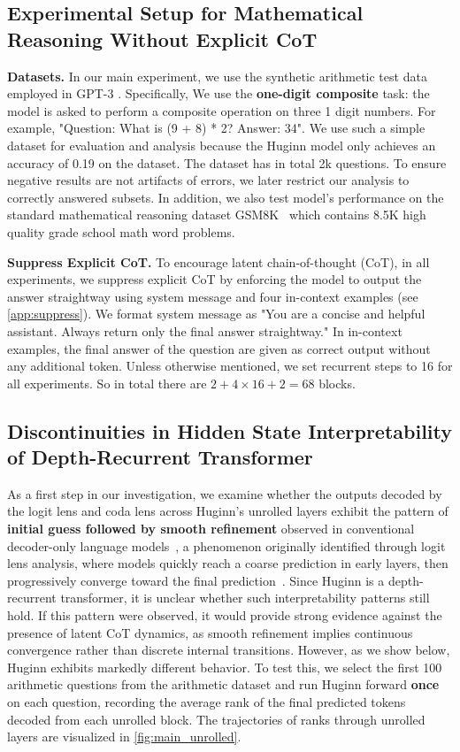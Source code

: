 \documentclass{article} %
\begin{document}
\subsection{Experimental Setup for Mathematical Reasoning Without Explicit CoT}
\textbf{Datasets.} 
In our main experiment, we use the synthetic arithmetic test data employed in GPT-3 \citep{gpt3}. Specifically, We use the \textbf{one-digit composite} task: the model is asked to perform a composite operation on three 1 digit numbers. For example, "Question: What is (9 + 8) * 2? Answer: 34". We use such a simple dataset for evaluation and analysis because the Huginn model only achieves an accuracy of 0.19 on the dataset. The dataset has in total 2k questions. To ensure negative results are not artifacts of errors, we later restrict our analysis to correctly answered subsets. In addition, we also test model's performance on the standard mathematical reasoning dataset GSM8K~\citep{cobbe2021training} which contains 8.5K high quality grade school math word problems. 


\textbf{Suppress Explicit CoT.} To encourage latent chain-of-thought (CoT), in all experiments, we suppress explicit CoT by enforcing the model to output the answer straightway using system message and four in-context examples (see \cref{app:suppress}). We format system message as "You are a concise and helpful assistant. Always return only the final answer straightway." In in-context examples, the final answer of the question are given as correct output without any additional token. Unless otherwise mentioned, we set recurrent steps to 16 for all experiments. So in total there are $2 + 4 \times 16 + 2 = 68$ blocks.


\subsection{Discontinuities in Hidden State Interpretability of Depth-Recurrent Transformer}\label{sec:decode}
As a first step in our investigation, we examine whether the outputs decoded by the logit lens and coda lens across Huginn's unrolled layers exhibit the pattern of \textbf{initial guess followed by smooth refinement} observed in conventional decoder-only language models~\citep{vaswani2017attention}, a phenomenon originally identified through logit lens analysis, where models quickly reach a coarse prediction in early layers, then progressively converge toward the final prediction~\citep{nostalgebraist2021logitlens}. Since Huginn is a depth-recurrent transformer, it is unclear whether such interpretability patterns still hold. If this pattern were observed, it would provide strong evidence against the presence of latent CoT dynamics, as smooth refinement implies continuous convergence rather than discrete internal transitions. However, as we show below, Huginn exhibits markedly different behavior. To test this, we select the first 100 arithmetic questions from the arithmetic dataset and run Huginn forward \textbf{once} on each question, recording the average rank of the final predicted tokens decoded from each unrolled block. The trajectories of ranks through unrolled layers are visualized in \cref{fig:main_unrolled}.
\end{document}
